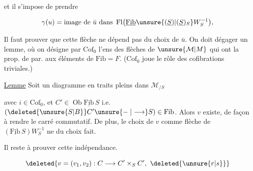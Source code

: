 
et il s'impose de prendre

\[
\gamma(u)=\text{image de }\bar u\text{ dans }\operatorname{Fl}\bigl(\underline{\mathrm{Fib}}\unsure{(\underline S)|(\underline S)_{S}}W_S^{-1}\bigr),
\]

Il faut prouver que cette flèche ne dépend pas du choix de $\bar u$. On doit dégager un lemme, où on désigne par  $\mathrm{Cof}_0$ l'ens des flèches de $\unsure{\mathcal M|M}$ qui ont la prop. de  par. aux éléments de $\mathrm{Fib}=F$. ($\mathrm{Cof}_0$ joue le rôle des cofibrations triviales.)

\uline{Lemme} Soit un diagramme en traits pleins dans $\mathcal M_{/S}$


avec $i\in\mathrm{Cof}_0$, et $C'\in\operatorname{Ob}\underline{\mathrm{Fib}}\,S$ i.e. $(\deleted{\unsure{S|B}}C'\unsure{\relbar|\longrightarrow} S)\in\mathrm{Fib}$. Alors $v$ existe, de façon à rendre le carré commutatif. De plus,  le choix de $v$  comme  flèche de $(\underline{\mathrm{Fib}}\, S) W_S^{-1}$ ne   du choix fait.

Il reste à prouver cette indépendance.


\[
\deleted{v=(v_1,v_2):C\longrightarrow C'\times_S C',\ \deleted{\unsure{r|s}}}
\]


